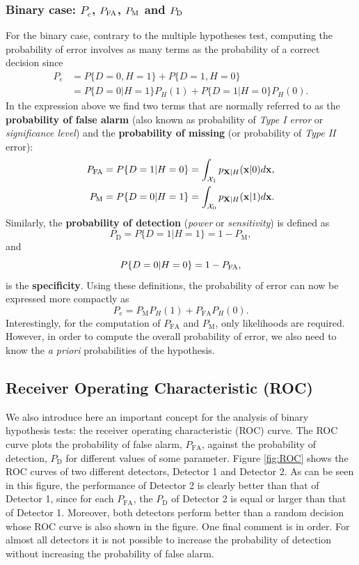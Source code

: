 \subsubsection{Binary case: $P_e$, $P_{\text{FA}}$, $P_{\text{M}}$ and $P_{\text{D}}$}
For the binary case, contrary to the multiple hypotheses test, computing the probability of error  involves as many terms as the probability of a correct decision since
\begin{align}
P_e & = P\{D=0, H=1\} + P\{D=1, H=0\} \nonumber \\
    & = P\{D=0|H=1\} P_H(1) + P\{D=1|H=0\} P_H(0). \nonumber
\end{align}
In the expression above we find two terms that are normally referred to as the \textbf{probability of false alarm} (also known as probability of \emph{Type I error} or \emph{significance level}) and the \textbf{probability of missing} (or probability of \emph{Type II} error):
\begin{align}
P_{\text{FA}}  & = P\{D=1|H=0\} = \int_{{\cal X}_1} p_{{\bf X}|H}({\bf x}|0) d{\bf x}, \nonumber \\
P_{\text{M}} & = P\{D=0|H=1\} = \int_{{\cal X}_0} p_{{\bf X}|H}({\bf x}|1) d{\bf x}. \nonumber
\end{align}
Similarly, the \textbf{probability of detection} (\emph{power} or \emph{sensitivity}) is defined as
$$P_\text{D} = P\{D=1|H=1\} = 1 - P_\text{M},$$
and
$$P\{D=0|H=0\} = 1 - P_{\text{FA}},$$
is the \textbf{specificity}. Using these definitions, the probability of error can now be expressed more compactly as
$$P_e = P_\text{M} P_H(1) + P_\text{FA} P_H(0).$$
Interestingly, for the computation of $P_\text{FA}$ and $P_\text{M}$, only likelihoods are required. However, in order to compute the overall probability of error, we also need to know the {\em a priori} probabilities of the hypothesis.

\subsection{Receiver Operating Characteristic (ROC)}

We also introduce here an important concept for the analysis of binary hypothesis tests: the receiver operating characteristic (ROC) curve. The ROC curve plots the probability of false alarm, $P_\text{FA}$, against the probability of detection, $P_\text{D}$ for different values of some parameter. Figure \ref{fig:ROC} shows the ROC curves of two different detectors, Detector 1 and Detector 2. As can be seen in this figure, the performance of Detector 2 is clearly better than that of Detector 1, since for each $P_\text{FA}$, the $P_\text{D}$ of Detector 2 is equal or larger than that of Detector 1. Moreover, both detectors perform better than a random decision whose ROC curve is also shown in the figure. One final comment is in order. For almost all detectors it is not possible to increase the probability of detection without increasing the probability of false alarm.

